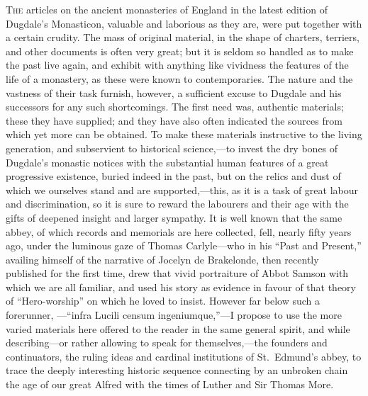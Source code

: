 \documentclass[10pt]{book}
\begin{document}
{\setlength{\parskip}{0.0\baselineskip}\setlength{\parindent}{10pt}

\noindent \textsc{The}  articles on the ancient monasteries of England in the latest edition of Dugdale's Monasticon, valuable and laborious as they are, were put together with a certain crudity. The mass of original material, in the shape of charters, terriers, and other documents is often very great; but it is seldom so handled as to make the past live again, and exhibit with anything like vividness the features of the life of a monastery, as these were known to contemporaries. The nature and the vastness of their task furnish, however, a sufficient excuse to Dugdale and his successors for any such shortcomings. The first need was, authentic materials; these they have supplied; and they have also often indicated the sources from which yet more can be obtained. To make these materials instructive to the living generation, and subservient to historical science,---to invest the dry bones of Dugdale's monastic notices with the substantial human features of a great progressive existence, buried indeed in the past, but on the relics and dust of which we ourselves stand and are supported,---this, as it is a task of great labour and discrimination, so it is sure to reward the labourers and their age with the gifts of deepened insight and larger sympathy. It is well known that the same abbey, of which records and memorials are here collected, fell, nearly fifty years ago, under the luminous gaze of Thomas Carlyle---who in his ``Past and Present,'' availing himself of the narrative of Jocelyn de Brakelonde, then recently published for the first time, drew that vivid portraiture of Abbot Samson with which we are all familiar, and used his story as evidence in favour of that theory of ``Hero-worship'' on which he loved to insist. However far below such a forerunner, ---``infra Lucili censum ingeniumque,''---I propose to use the more varied materials here offered to the reader in the same general spirit, and while describing---or rather allowing to speak for themselves,---the founders and continuators, the ruling ideas and cardinal institutions of St.\ Edmund's abbey, to trace the deeply interesting historic sequence connecting by an unbroken chain the age of our great Alfred with the times of Luther and Sir Thomas More.

}
\end{document}
